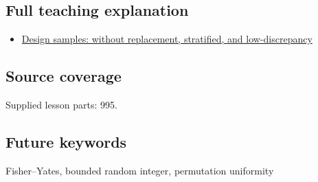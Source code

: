 \subsection{Full teaching explanation}\label{appendix-184fcc411663-full-teaching-explanation}

\begin{itemize}
\tightlist
\item
  \hyperref[02-foundations-ii-ch031-design-samples-without-replacement-stratified-and-low-discrepancy]{Design samples: without replacement, stratified, and low-discrepancy}
\end{itemize}

\subsection{Source coverage}\label{appendix-184fcc411663-source-coverage}

Supplied lesson parts: 995.

\subsection{Future keywords}\label{appendix-184fcc411663-future-keywords}

Fisher--Yates, bounded random integer, permutation uniformity
